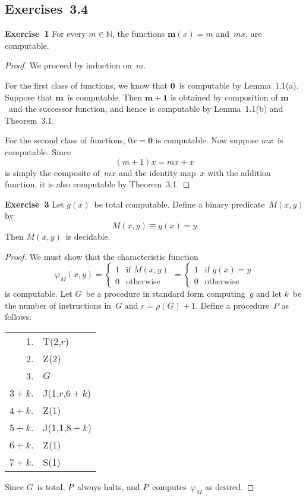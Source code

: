 \documentclass[letterpaper]{article}
\newcommand{\exercise}[2][]{\noindent\textbf{Exercise~{#2}}\ifthenelse{\isempty{#1}}{\textbf{.}}{ ({#1})\textbf{.}}}
\newcommand{\N}{\mathbb{N}}
\theoremstyle{plain}
\theoremstyle{definition}
\theoremstyle{remark}
\begin{document}
\subsection*{Exercises~3.4}
\exercise{1}
For every $m\in\N$, the functions $\mathbf{m}(x)=m$ and~$mx$, are computable.
\begin{proof}
We proceed by induction on~$m$.

For the first class of functions, we know that $\mathbf{0}$~is computable by Lemma~1.1(a). Suppose that $\mathbf{m}$~is computable. Then $\mathbf{m+1}$ is obtained by composition of $\mathbf{m}$~and the successor function, and hence is computable by Lemma~1.1(b) and Theorem~3.1.

For the second class of functions, $0x=\mathbf{0}$ is computable. Now suppose $mx$~is computable. Since
$$(m+1)x=mx+x$$
is simply the composite of~$mx$ and the identity map~$x$ with the addition function, it is also computable by Theorem~3.1.
\end{proof}

\exercise{3}
Let $g(x)$~be total computable. Define a binary predicate~$M(x,y)$ by
$$M(x,y)\equiv g(x)=y$$
Then $M(x,y)$~is decidable.
\begin{proof}
We must show that the characteristic function
$$\varphi_M(x,y)=
\begin{cases}
1&\text{if }M(x,y)\\
0&\text{otherwise}
\end{cases}=
\begin{cases}
1&\text{if }g(x)=y\\
0&\text{otherwise}
\end{cases}$$
is computable. Let $G$~be a procedure in standard form computing~$g$ and let $k$~be the number of instructions in~$G$ and $r=\rho(G)+1$. Define a procedure~$P$ as follows:
\begin{center}
\begin{tabular}{rl}
1.&T(2,$r$)\\
2.&Z(2)\\
3.&$G$\\
$3+k$.&J(1,$r$,$6+k$)\\
$4+k$.&Z(1)\\
$5+k$.&J(1,1,$8+k$)\\
$6+k$.&Z(1)\\
$7+k$.&S(1)
\end{tabular}
\end{center}
Since $G$~is total, $P$~always halts, and $P$~computes~$\varphi_M$ as desired.
\end{proof}
\end{document}
